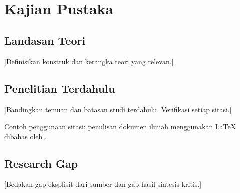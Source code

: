 \chapter{Kajian Pustaka}
\section{Landasan Teori}
[Definisikan konstruk dan kerangka teori yang relevan.]

\section{Penelitian Terdahulu}
[Bandingkan temuan dan batasan studi terdahulu. Verifikasi setiap sitasi.]

Contoh penggunaan sitasi: penulisan dokumen ilmiah menggunakan \LaTeX{} dibahas oleh \citet{lamport1994latex}.

\section{Research Gap}
[Bedakan gap eksplisit dari sumber dan gap hasil sintesis kritis.]
